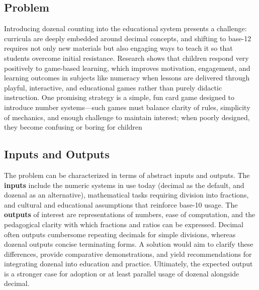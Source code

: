\documentclass{article}
\begin{document}
    \subsection{Problem}
    Introducing dozenal counting into the educational system presents a challenge: curricula are deeply embedded around 
    decimal concepts, and shifting to base-12 requires not only new materials but also engaging ways to teach it so that 
    students overcome initial resistance. Research shows that children respond very positively to game-based learning, 
    which improves motivation, engagement, and learning outcomes in subjects like numeracy when lessons are delivered 
    through playful, interactive, and educational games rather than purely didactic instruction. One promising strategy 
    is a simple, fun card game designed to introduce number systems—such games must balance clarity of rules, simplicity 
    of mechanics, and enough challenge to maintain interest; when poorly designed, they become confusing or boring for children

    
    \subsection{Inputs and Outputs}
    The problem can be characterized in terms of abstract inputs and outputs. The 
    \textbf{inputs} include the numeric systems in use today (decimal as the default, 
    and dozenal as an alternative), mathematical tasks requiring division into 
    fractions, and cultural and educational assumptions that reinforce base-10 usage. 
    The \textbf{outputs} of interest are representations of numbers, ease of computation, 
    and the pedagogical clarity with which fractions and ratios can be expressed. 
    Decimal often outputs cumbersome repeating decimals for simple divisions, whereas 
    dozenal outputs concise terminating forms. A solution would aim to clarify these 
    differences, provide comparative demonstrations, and yield recommendations for 
    integrating dozenal into education and practice. Ultimately, the expected output 
    is a stronger case for adoption or at least parallel usage of dozenal alongside decimal.
\end{document}
